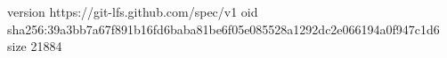 version https://git-lfs.github.com/spec/v1
oid sha256:39a3bb7a67f891b16fd6baba81be6f05e085528a1292dc2e066194a0f947c1d6
size 21884
